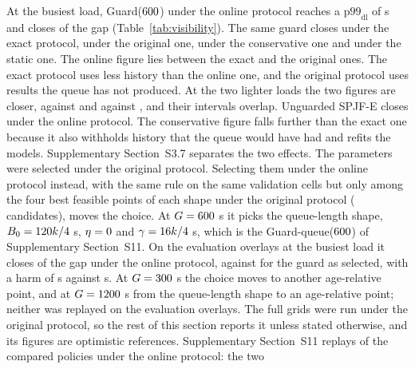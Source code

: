 At the busiest load, Guard($600$) under the online protocol reaches a
$\mathrm{p99}_{\mathrm{dl}}$ of  s and closes  of
the gap (Table~\ref{tab:visibility}). The same guard closes 
under the exact protocol,  under the original one,
 under the conservative one and 
under the static one. The online figure lies between the exact and the original ones. The
exact protocol uses less history than the online one, and the original protocol uses
results the queue has not produced. At the two lighter loads the two figures are closer,
 against  and  against , and their
intervals overlap. Unguarded SPJF-E closes  under the online protocol. The
conservative figure falls further than the exact one because it also withholds history that
the queue would have had and refits the models. Supplementary Section~S3.7 separates the
two effects.
The parameters were selected under the original protocol. Selecting them under the online
protocol instead, with the same rule on the same validation cells but only among the four
best feasible points of each shape under the original protocol ( candidates),
moves the choice. At $G = 600$ s it picks the queue-length shape, $B_0 =
120k/4$ s, $\eta = 0$ and $\gamma = 16k/4$ s, which is the
Guard-queue($600$) of Supplementary Section~S11. On the evaluation overlays at the
busiest load it closes  of the gap under the online protocol,
against  for the guard as selected, with a harm of  s against
 s. At $G = 300$ s the choice moves to another age-relative point, and
at $G = 1200$ s from the queue-length shape to an age-relative point; neither was
replayed on the evaluation overlays.
The full grids were run under the original protocol, so the rest of this section reports it
unless stated otherwise, and its figures are optimistic references. Supplementary
Section~S11 replays  of the compared policies under the online protocol: the two
